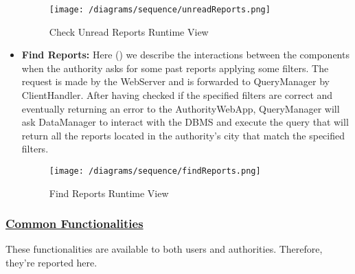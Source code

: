 \begin{itemize}
				\begin{figure}[h!]
					\centering
					\texttt{[image: /diagrams/sequence/unreadReports.png]}
					\caption{\label{fig:unreadReportsRuntime} Check Unread Reports Runtime View}
				\end{figure}
			
				\item \textbf{Find Reports:} Here () we describe the interactions between the components when the authority asks for some past reports applying some filters. The request is made by the WebServer and is forwarded to QueryManager by ClientHandler. After having checked if the specified filters are correct and eventually returning an error to the AuthorityWebApp, QueryManager will ask DataManager to interact with the DBMS and execute the query that will return all the reports located in the authority’s city that match the specified filters.
				
				\begin{figure}[h!]
					\centering
					\texttt{[image: /diagrams/sequence/findReports.png]}
					\caption{\label{fig:findReportsRuntime} Find Reports Runtime View}
				\end{figure}
			\end{itemize}
		
		\subsubsection[Common Functionalities]{\hyperlink{toc}{Common Functionalities}}
			\label{sec:commonFunctionalitiesRuntime}
			
			These functionalities are available to both users and authorities. Therefore, they're reported here.
			
